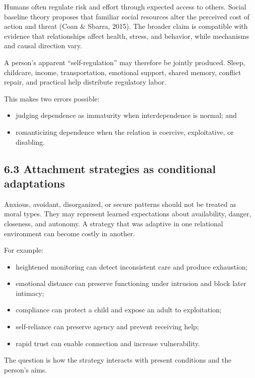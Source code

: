 \documentclass[
  11pt,
]{article}
\providecommand{\tightlist}{%
  \setlength{\itemsep}{0pt}\setlength{\parskip}{0pt}}
\begin{document}
Humans often regulate risk and effort through expected access to others.
Social baseline theory proposes that familiar social resources alter the
perceived cost of action and threat (Coan \& Sbarra, 2015). The broader
claim is compatible with evidence that relationships affect health,
stress, and behavior, while mechanisms and causal direction vary.

A person's apparent ``self-regulation'' may therefore be jointly
produced. Sleep, childcare, income, transportation, emotional support,
shared memory, conflict repair, and practical help distribute regulatory
labor.

This makes two errors possible:

\begin{itemize}
\tightlist
\item
  judging dependence as immaturity when interdependence is normal; and
\item
  romanticizing dependence when the relation is coercive, exploitative,
  or disabling.
\end{itemize}

\subsection{6.3 Attachment strategies as conditional
adaptations}\label{attachment-strategies-as-conditional-adaptations}

Anxious, avoidant, disorganized, or secure patterns should not be
treated as moral types. They may represent learned expectations about
availability, danger, closeness, and autonomy. A strategy that was
adaptive in one relational environment can become costly in another.

For example:

\begin{itemize}
\tightlist
\item
  heightened monitoring can detect inconsistent care and produce
  exhaustion;
\item
  emotional distance can preserve functioning under intrusion and block
  later intimacy;
\item
  compliance can protect a child and expose an adult to exploitation;
\item
  self-reliance can preserve agency and prevent receiving help;
\item
  rapid trust can enable connection and increase vulnerability.
\end{itemize}

The question is how the strategy interacts with present conditions and
the person's aims.
\end{document}
